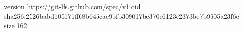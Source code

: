 version https://git-lfs.github.com/spec/v1
oid sha256:2526babd105171ff68b645cae9bfb309017be370e6123e2373be7b9605a23f6c
size 162
